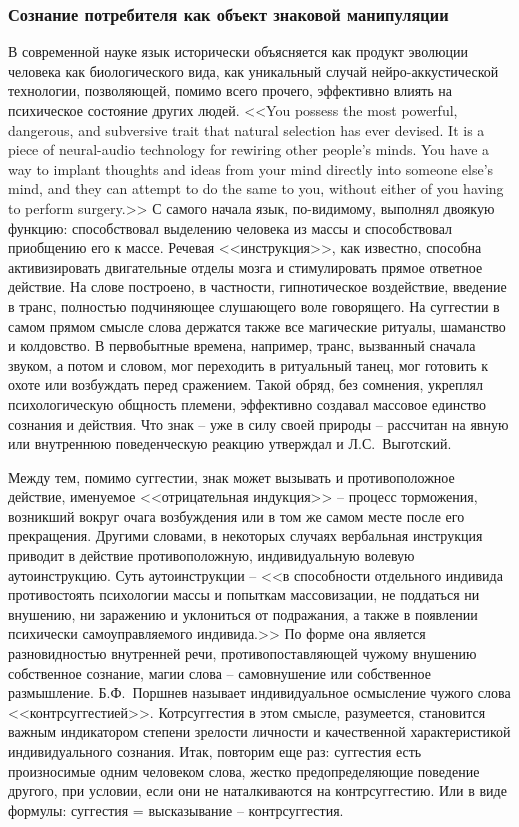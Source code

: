 \subsubsection{Сознание потребителя как объект знаковой манипуляции}
\label{2.3}
В современной науке язык исторически объясняется как продукт эволюции
человека как биологического вида, как уникальный случай нейро-аккустической технологии,
позволяющей, помимо всего прочего, эффективно влиять на психическое состояние
других людей. <<You possess the most powerful, dangerous, and subversive trait that
natural selection has ever devised. It is a piece of neural-audio technology for
rewiring other people’s minds. You have a way to implant thoughts and ideas from
your mind directly into someone else’s mind, and they can attempt to do the
same to you, without either of you having to perform surgery.>>\autocite{pagel2012wired}
С самого начала язык, по-видимому, выполнял двоякую функцию: способствовал выделению
человека из массы и способствовал приобщению его к массе. Речевая <<инструкция>>,
как известно, способна активизировать двигательные отделы мозга и стимулировать
прямое ответное действие. На слове построено, в частности, гипнотическое воздействие,
введение в транс, полностью подчиняющее слушающего воле говорящего. На суггестии
в самом прямом смысле слова держатся также все магические ритуалы, шаманство и
колдовство. В первобытные времена, например, транс, вызванный сначала звуком,
а потом и словом, мог переходить в ритуальный танец, мог готовить к охоте или
возбуждать перед сражением.\autocite{porshnev1974} Такой обряд, без сомнения,
укреплял психологическую общность племени, эффективно создавал массовое единство
сознания и действия. Что знак -- уже в силу своей природы -- рассчитан на явную или
внутреннюю поведенческую реакцию утверждал и Л.С.~Выготский.\autocite[][179]{vigotsky1956}

Между тем, помимо суггестии, знак может вызывать и противоположное действие,
именуемое <<отрицательная индукция>> -- процесс торможения, возникший вокруг очага
возбуждения или в том же самом месте после его прекращения. Другими словами,
в некоторых случаях вербальная инструкция приводит в действие противоположную,
индивидуальную волевую аутоинструкцию. Суть аутоинструкции -- <<в способности
отдельного индивида противостоять психологии массы и попыткам массовизации,
не поддаться ни внушению, ни заражению и уклониться от подражания, а также в
появлении психически самоуправляемого индивида.>>\autocite[][96]{book:olshansky}
По форме она является разновидностью внутренней речи, противопоставляющей чужому
внушению собственное сознание, магии слова -- самовнушение или собственное размышление.
Б.Ф.~Поршнев называет индивидуальное осмысление чужого слова <<контрсуггестией>>.\autocite{porshnev1974}
Котрсуггестия в этом смысле, разумеется, становится важным индикатором степени
зрелости личности и качественной характеристикой индивидуального сознания.
Итак, повторим еще раз: суггестия есть произносимые одним человеком слова,
жестко предопределяющие поведение другого, при условии, если они не наталкиваются
на контрсуггестию. Или в виде формулы: суггестия = высказывание -- контрсуггестия.

